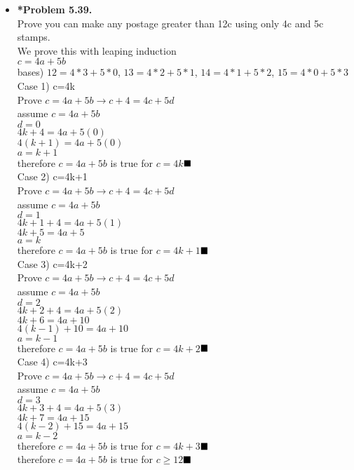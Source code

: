\documentclass[11pt]{article}
\def\imp{\rightarrow}
\begin{document}
\begin{itemize}
\item \textbf{*Problem 5.39.} 
\\Prove you can make any postage greater than 12c using only 4c and 5c stamps. 
\\We prove this with leaping induction
\\$c=4a+5b$
\\bases) $12=4*3+5*0$, $13=4*2+5*1$, $14=4*1+5*2$, $15=4*0+5*3$
\\Case 1) c=4k
\\Prove $c=4a+5b \imp c+4=4c+5d$
\\assume $c=4a+5b$
\\$d=0$
\\$4k+4=4a+5(0)$
\\$4(k+1)=4a+5(0)$
\\$a=k+1$
\\therefore $c=4a+5b$ is true for $c=4k$$\hfill\blacksquare$
\\Case 2) c=4k+1
\\Prove $c=4a+5b \imp c+4=4c+5d$
\\assume $c=4a+5b$
\\$d=1$
\\$4k+1+4=4a+5(1)$
\\$4k+5=4a+5$
\\$a=k$
\\therefore $c=4a+5b$ is true for $c=4k+1$$\hfill\blacksquare$
\\Case 3) c=4k+2
\\Prove $c=4a+5b \imp c+4=4c+5d$
\\assume $c=4a+5b$
\\$d=2$
\\$4k+2+4=4a+5(2)$
\\$4k+6=4a+10$
\\$4(k-1)+10=4a+10$
\\$a=k-1$
\\therefore $c=4a+5b$ is true for $c=4k+2$$\hfill\blacksquare$
\\Case 4) c=4k+3
\\Prove $c=4a+5b \imp c+4=4c+5d$
\\assume $c=4a+5b$
\\$d=3$
\\$4k+3+4=4a+5(3)$
\\$4k+7=4a+15$
\\$4(k-2)+15=4a+15$
\\$a=k-2$
\\therefore $c=4a+5b$ is true for $c=4k+3$$\hfill\blacksquare$
\\therefore $c=4a+5b$ is true for $c\ge12$$\hfill\blacksquare$


\end{itemize}
\end{document}
